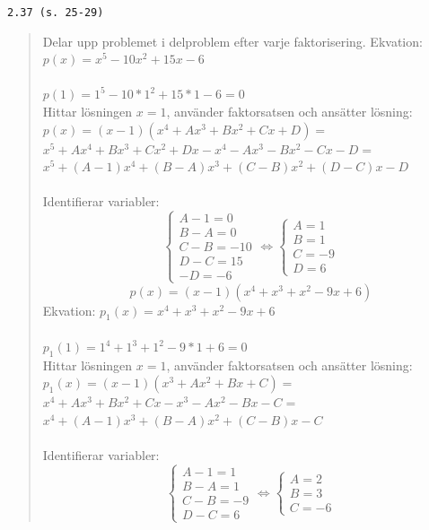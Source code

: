 \documentclass[a4paper]{article}
\newcommand{\tskcol}[1]{\textcolor{tskcol}{#1}}
\begin{document}
	\texttt{\tskcol{2.37 (s. 25-29)}}
	\begin{quotation}
		\noindent
		Delar upp problemet i delproblem efter varje faktorisering.
		Ekvation: $p(x)=x^5-10x^2+15x-6$ \\ \\
		$p(1)=1^5-10*1^2+15*1-6=0$ \\
		Hittar lösningen $x=1$, använder faktorsatsen och ansätter lösning: \\
		$p(x)=(x-1)(x^4+Ax^3+Bx^2+Cx+D)=$ \\
		$x^5+Ax^4+Bx^3+Cx^2+Dx-x^4-Ax^3-Bx^2-Cx-D=$ \\
		$x^5+(A-1)x^4+(B-A)x^3+(C-B)x^2+(D-C)x-D$ \\ \\
		Identifierar variabler: \\
		\[\begin{cases} 
		A-1=0 \\ 
		B-A=0 \\ 
		C-B=-10 \\
		D-C=15 \\
		-D=-6
		\end{cases}
		\Leftrightarrow
		\begin{cases} 
		A=1 \\ 
		B=1 \\
		C=-9 \\
		D=6
		\end{cases}\]
		\[p(x)=(x-1)(x^4+x^3+x^2-9x+6)\]
		Ekvation: $p_1(x)=x^4+x^3+x^2-9x+6$ \\ \\
		$p_1(1)=1^4+1^3+1^2-9*1+6=0$ \\
		Hittar lösningen $x=1$, använder faktorsatsen och ansätter lösning: \\
		$p_1(x)=(x-1)(x^3+Ax^2+Bx+C)=$ \\
		$x^4+Ax^3+Bx^2+Cx-x^3-Ax^2-Bx-C=$ \\
		$x^4+(A-1)x^3+(B-A)x^2+(C-B)x-C$ \\ \\
		Identifierar variabler: \\
		\[\begin{cases} 
		A-1=1 \\ 
		B-A=1 \\ 
		C-B=-9 \\
		D-C=6
		\end{cases}
		\Leftrightarrow
		\begin{cases} 
		A=2 \\ 
		B=3 \\
		C=-6

\end{cases}\]
\end{quotation}
\end{document}
